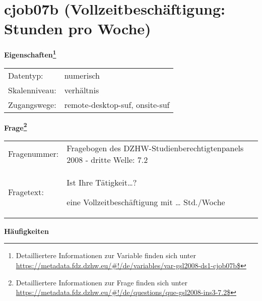
    \setcounter{footnote}{0}

    \vspace*{-1.8cm}
	\section{cjob07b (Vollzeitbeschäftigung: Stunden pro Woche)}
	\label{section:cjob07b}



    \vspace*{0.5cm}
    \noindent\textbf{Eigenschaften\footnote{Detailliertere Informationen zur Variable finden sich unter
		\url{https://metadata.fdz.dzhw.eu/\#!/de/variables/var-gsl2008-ds1-cjob07b$}}}\\
	\begin{tabularx}{\hsize}{@{}lX}
	Datentyp: & numerisch \\
	Skalenniveau: & verhältnis \\
	Zugangswege: &
	  remote-desktop-suf, 
	  onsite-suf
 \\
    \end{tabularx}



				\vspace*{0.5cm}
                \noindent\textbf{Frage\footnote{Detailliertere Informationen zur Frage finden sich unter
		              \url{https://metadata.fdz.dzhw.eu/\#!/de/questions/que-gsl2008-ins3-7.2$}}}\\
				\begin{tabularx}{\hsize}{@{}lX}
					Fragenummer: &
					  Fragebogen des DZHW-Studienberechtigtenpanels 2008 - dritte Welle:
					  7.2
 \\
					Fragetext: & Ist Ihre Tätigkeit…?\par  eine Vollzeitbeschäftigung mit … Std./Woche \\
				\end{tabularx}





        		\vspace*{0.5cm}
                \noindent\textbf{Häufigkeiten}

